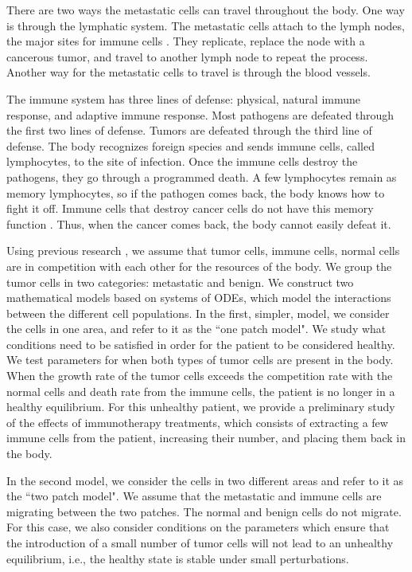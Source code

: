 \documentclass[letter,10pt]{article}
\begin{document}
There are two ways the metastatic cells can travel throughout the body. One way is through the lymphatic system. The metastatic cells attach to the lymph nodes, the major sites for immune cells \cite{NIH}. They replicate, replace the node with a cancerous tumor, and travel to another lymph node to repeat the process. Another way for the metastatic cells to travel is through the blood vessels.

The immune system has three lines of defense: physical, natural immune response, and adaptive immune response. Most pathogens are defeated through the first two lines of defense. Tumors are defeated through the third line of defense. The body recognizes foreign species and sends immune cells, called lymphocytes, to the site of infection. Once the immune cells destroy the pathogens, they go through a programmed death. A few lymphocytes remain as memory lymphocytes, so if the pathogen comes back, the body knows how to fight it off. Immune cells that destroy cancer cells do not have this memory function \cite{GABRIEL}. Thus, when the cancer comes back, the body cannot easily defeat it.

Using previous research \cite{DEPILLIS}, we assume that tumor cells, immune cells, normal cells are in competition with each other for the resources of the body. We group the tumor cells in two categories: metastatic and benign. We construct two mathematical models based on systems of ODEs, which model the interactions between the different cell populations. In the first, simpler, model, we consider the cells in one area, and refer to it as the ``one patch model". We study what conditions need to be satisfied in order for the patient to be considered healthy. We test parameters for when both types of tumor cells are present in the body. When the growth rate of the tumor cells exceeds the competition rate with the normal cells and death rate from the immune cells, the patient is no longer in a healthy equilibrium. For this unhealthy patient, we provide a preliminary study of the effects of immunotherapy treatments, which consists of extracting a few immune cells from the patient, increasing their number, and placing them back in the body.

In the second model, we consider the cells in two different areas and refer to it as the ``two patch model". We assume that the metastatic and immune cells are migrating between the two patches. The normal and benign cells do not migrate. For this case, we also consider conditions on the parameters which ensure that the introduction of a small number of tumor cells will not lead to an unhealthy equilibrium, i.e., the healthy state is stable under small perturbations. 
\end{document}
